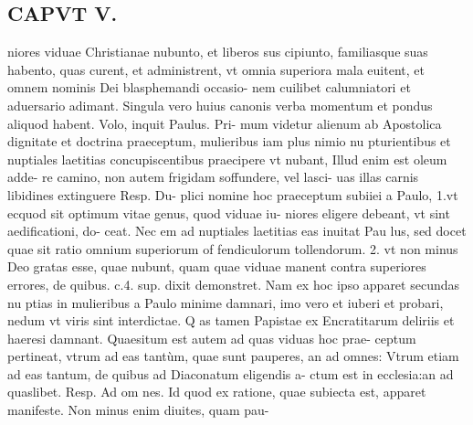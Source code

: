 \documentclass{article}
\begin{document}
\begin{pages}
\section*{CAPVT  V. }
\marginpar{[ p.297 ]}\pstart niores viduae Christianae nubunto, et liberos sus cipiunto, familiasque suas habento, quas curent, et administrent, vt omnia superiora mala euitent, et omnem nominis Dei blasphemandi occasio- nem cuilibet calumniatori et aduersario adimant. Singula vero huius canonis verba momentum et pondus aliquod habent. Volo, inquit Paulus. Pri- mum videtur alienum ab Apostolica dignitate et doctrina praeceptum, mulieribus iam plus nimio nu pturientibus et nuptiales laetitias concupiscentibus praecipere vt nubant, Illud enim est oleum adde- re camino, non autem frigidam soffundere, vel lasci- uas illas carnis libidines extinguere Resp. Du- plici nomine hoc praeceptum subiiei a Paulo, 1.vt ecquod sit optimum vitae genus, quod viduae iu- niores eligere debeant, vt sint aedificationi, do- ceat. Nec em ad nuptiales laetitias eas inuitat Pau lus, sed docet quae sit ratio omnium superiorum of fendiculorum tollendorum. 2. vt non minus Deo gratas esse, quae nubunt, quam quae viduae manent contra superiores errores, de quibus. c.4. sup. dixit demonstret. Nam ex hoc ipso apparet secundas nu ptias in mulieribus a Paulo minime damnari, imo vero et iuberi et probari, nedum vt viris sint interdictae. Q as tamen Papistae ex Encratitarum deliriis et haeresi damnant.  \pend\pstart Quaesitum est autem ad quas viduas hoc prae- ceptum pertineat, vtrum ad eas tantùm, quae sunt pauperes, an ad omnes: Vtrum etiam ad eas tantum, de quibus ad Diaconatum eligendis a- ctum est in ecclesia:an ad quaslibet. Resp. Ad om nes. Id quod ex ratione, quae subiecta est, apparet manifeste. Non minus enim diuites, quam pau-  \pend

\end{pages}
\end{document}
